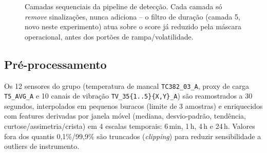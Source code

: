 \documentclass[11pt,a4paper]{article}
\begin{document}
\begin{figure}[H]
\centering
{}
\caption{Camadas sequenciais da pipeline de detecção. Cada camada só
\emph{remove} sinalizações, nunca adiciona -- o filtro de duração
(camada 5, novo neste experimento) atua sobre o score já reduzido pela
máscara operacional, antes dos portões de rampa/volatilidade.}
\label{fig:arquitetura}
\end{figure}

\subsection{Pré-processamento}
Os 12 sensores do grupo (temperatura de mancal \texttt{TC382\_03\_A},
proxy de carga \texttt{T5\_AVG\_A} e 10 canais de vibração
\texttt{TV\_35\{1..5\}\{X,Y\}\_A}) são reamostrados a 30 segundos,
interpolados em pequenos buracos (limite de 3 amostras) e enriquecidos
com features derivadas por janela móvel (mediana, desvio-padrão,
tendência, curtose/assimetria/crista) em 4 escalas temporais: 6\,min,
1\,h, 4\,h e 24\,h. Valores fora dos quantis 0,1\%/99,9\% são
truncados (\emph{clipping}) para reduzir sensibilidade a outliers de
instrumento.
\end{document}
